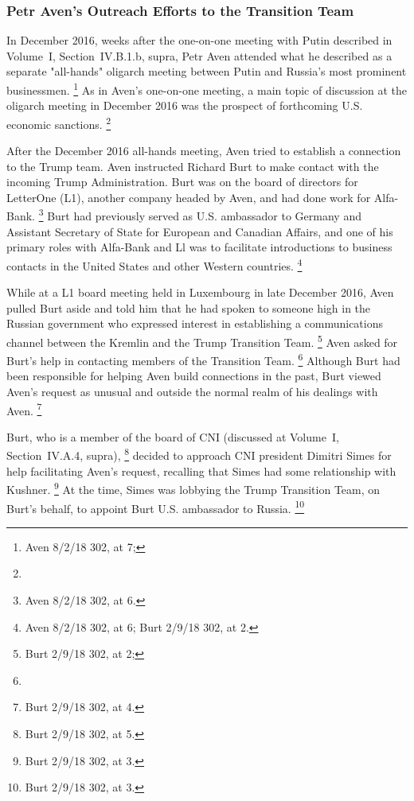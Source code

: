 \subsubsection{Petr Aven's Outreach Efforts to the Transition Team}

In December 2016, weeks after the one-on-one meeting with Putin described in Volume~I, Section~IV.B.1.b, supra, Petr Aven attended what he described as a separate "all-hands" oligarch meeting between Putin and Russia's most prominent businessmen.%
\footnote{Aven 8/2/18 302, at 7; }
As in Aven's one-on-one meeting, a main topic of discussion at the oligarch meeting in December 2016 was the prospect of forthcoming U.S. economic sanctions.%
\footnote{}

After the December 2016 all-hands meeting, Aven tried to establish a connection to the Trump team.
Aven instructed Richard Burt to make contact with the incoming Trump Administration.
Burt was on the board of directors for LetterOne (L1), another company headed by Aven, and had done work for Alfa-Bank.%
\footnote{ Aven 8/2/18 302, at 6.}
Burt had previously served as U.S. ambassador to Germany and Assistant Secretary of State for European and Canadian Affairs, and one of his primary roles with Alfa-Bank and Ll was to facilitate introductions to business contacts in the United States and other Western countries.%
\footnote{ Aven 8/2/18 302, at 6;
Burt 2/9/18 302, at 2.}

While at a L1 board meeting held in Luxembourg in late December 2016, Aven pulled Burt aside and told him that he had spoken to someone high in the Russian government who expressed interest in establishing a communications channel between the Kremlin and the Trump Transition Team.%
\footnote{Burt 2/9/18 302, at 2; }
Aven asked for Burt's help in contacting members of the Transition Team.%
\footnote{}
Although Burt had been responsible for helping Aven build connections in the past, Burt viewed Aven's request as unusual and outside the normal realm of his dealings with Aven.%
\footnote{Burt 2/9/18 302, at 4.}

Burt, who is a member of the board of CNI (discussed at Volume~I, Section~IV.A.4, supra),%
\footnote{Burt 2/9/18 302, at 5.}
decided to approach CNI president Dimitri Simes for help facilitating Aven's request, recalling that Simes had some relationship with Kushner.%
\footnote{Burt 2/9/18 302, at 3.}
At the time, Simes was lobbying the Trump Transition Team, on Burt's behalf, to appoint Burt U.S. ambassador to Russia.%
\footnote{Burt 2/9/18 302, at 3.}

